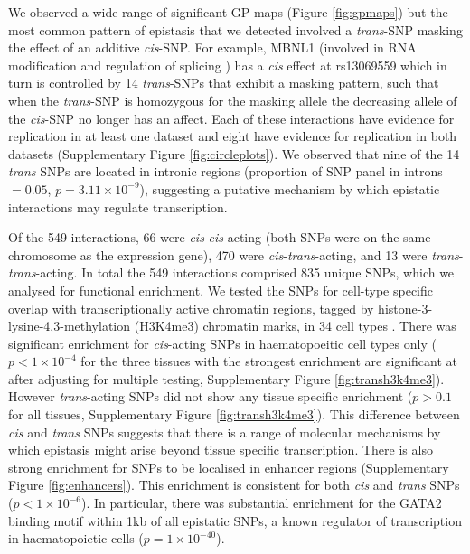 \documentclass{article}
\begin{document}
We observed a wide range of significant GP maps (Figure \ref{fig:gpmaps}) but the most common pattern of epistasis that we detected involved a \emph{trans}-SNP masking the effect of an additive \emph{cis}-SNP. For example, MBNL1 (involved in RNA modification and regulation of splicing \cite{Ho2004}) has a \emph{cis} effect at rs13069559 which in turn is controlled by 14 \emph{trans}-SNPs that exhibit a masking pattern, such that when the \emph{trans}-SNP is homozygous for the masking allele the decreasing allele of the \emph{cis}-SNP no longer has an affect. Each of these interactions have evidence for replication in at least one dataset and eight have evidence for replication in both datasets (Supplementary Figure \ref{fig:circleplots}). We observed that nine of the 14 \emph{trans} SNPs are located in intronic regions (proportion of SNP panel in introns $= 0.05$, $p = 3.11 \times 10^{-9}$), suggesting a putative mechanism by which epistatic interactions may regulate transcription.


Of the 549 interactions, 66 were \emph{cis}-\emph{cis} acting (both SNPs were on the same chromosome as the expression gene), 470 were \emph{cis}-\emph{trans}-acting, and 13 were \emph{trans}-\emph{trans}-acting. In total the 549 interactions comprised 835 unique SNPs, which we analysed for functional enrichment. We tested the SNPs for cell-type specific overlap with transcriptionally active chromatin regions, tagged by histone-3-lysine-4,3-methylation (H3K4me3) chromatin marks, in 34 cell types \cite{Trynka2013}. There was significant enrichment for \emph{cis}-acting SNPs in haematopoeitic cell types only ($p < 1 \times 10^{-4}$ for the three tissues with the strongest enrichment are significant at after adjusting for multiple testing, Supplementary Figure \ref{fig:transh3k4me3}). However \emph{trans}-acting SNPs did not show any tissue specific enrichment ($p > 0.1$ for all tissues, Supplementary Figure \ref{fig:transh3k4me3}). This difference between \emph{cis} and \emph{trans} SNPs suggests that there is a range of molecular mechanisms by which epistasis might arise beyond tissue specific transcription. There is also strong enrichment for SNPs to be localised in enhancer regions \cite{Ward2012a} (Supplementary Figure \ref{fig:enhancers}). This enrichment is consistent for both \emph{cis} and \emph{trans} SNPs ($p < 1 \times 10^{-6}$). In particular, there was substantial enrichment for the GATA2 binding motif within 1kb of all epistatic SNPs, a known regulator of transcription in haematopoietic cells \cite{Tsai1994} ($p = 1 \times 10^{-40}$).
\end{document}
